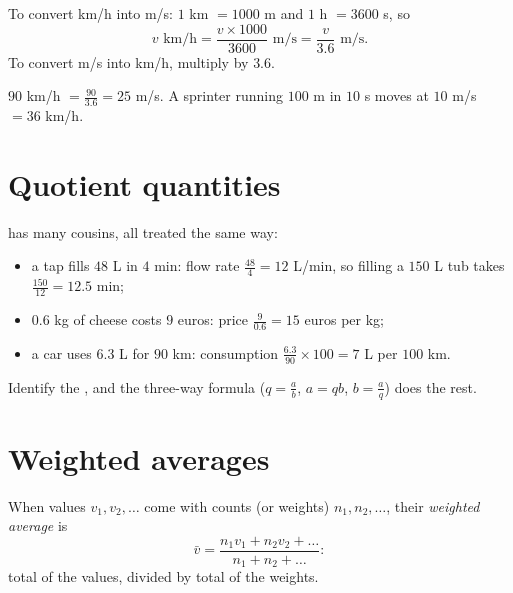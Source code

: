 \begin{method}\label{met:g8:speed:convert}
To convert km/h into m/s: $1$ km $= 1000$ m and $1$ h $= 3600$ s, so
\[
v \text{ km/h} = \frac{v \times 1000}{3600} \text{ m/s}
= \frac{v}{3.6} \text{ m/s}.
\]
To convert m/s into km/h, multiply by $3.6$.
\end{method}

\begin{example}\label{ex:g8:speed:convert}
$90$ km/h $= \frac{90}{3.6} = 25$ m/s. A sprinter running $100$ m in
$10$ s moves at $10$ m/s $= 36$ km/h.
\end{example}

\section{Quotient quantities}

\begin{example}\label{ex:g8:speed:quotients}
 has many cousins, all treated the same way:
\begin{itemize}
  \item a tap fills $48$ L in $4$ min: flow rate
        $\frac{48}{4} = 12$ L/min, so filling a $150$ L tub takes
        $\frac{150}{12} = 12.5$ min;
  \item $0.6$ kg of cheese costs $9$ euros: price
        $\frac{9}{0.6} = 15$ euros per kg;
  \item a car uses $6.3$ L for $90$ km: consumption
        $\frac{6.3}{90} \times 100 = 7$ L per $100$ km.
\end{itemize}
Identify the , and the three-way formula
($q = \frac ab$, $a = qb$, $b = \frac aq$) does the rest.
\end{example}

\section{Weighted averages}

\begin{definition}\label{def:g8:speed:average}
When values $v_1, v_2, \dots$ come with counts (or weights)
$n_1, n_2, \dots$, their \emph{weighted average}
is
\[
\bar v = \frac{n_1 v_1 + n_2 v_2 + \dots}{n_1 + n_2 + \dots} :
\]
total of the values, divided by total of the weights.
\end{definition}

